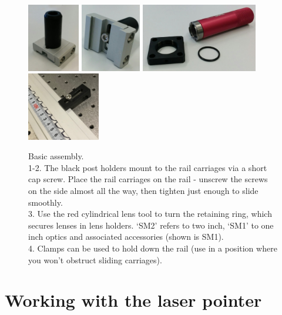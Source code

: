 \documentclass[a4paper]{report}
\begin{document}
	\begin{figure}[h]
		\center
		\includegraphics[width=0.9in]{post_mounted.eps}
		\includegraphics[width=1.03in]{post_mounted_underside.eps}
		\includegraphics[width=2in]{lens_tool.eps}
		\includegraphics[width=1.25in]{figures/clamping_rail.jpg}
		\captionsetup{width=0.95\textwidth}
		\caption{Basic assembly.
		\\
		1-2. The black post holders mount to the rail carriages via a short cap screw. Place the rail carriages on the rail - unscrew the screws on the side almost all the way, then tighten just enough to slide smoothly.
		\\
		3. Use the red cylindrical lens tool to turn the retaining ring, which secures lenses in lens holders. `SM2' refers to two inch, `SM1' to one inch optics and associated accessories (shown is SM1).
		\\
		4. Clamps can be used to hold down the rail (use in a position where you won't obstruct sliding carriages).}
		\label{fig:post}
	\end{figure}
	
	
	
	\section{Working with the laser pointer}
	
\end{document}
